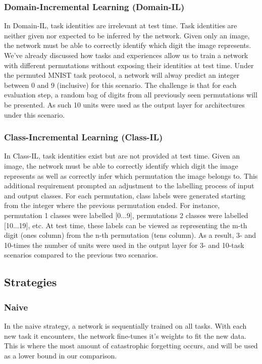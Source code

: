 \documentclass{article}
\begin{document}
\subsubsection{Domain-Incremental Learning (Domain-IL)}
In Domain-IL, task identities are irrelevant at test time. Task identities are neither given nor expected to be inferred by the network. Given only an image, the network must be able to correctly identify which digit the image represents. We’ve already discussed how tasks and experiences allow us to train a network with different permutations without exposing their identities at test time. Under the permuted MNIST task protocol, a network will alway predict an integer between 0 and 9 (inclusive) for this scenario. The challenge is that for each evaluation step, a random bag of digits from all previously seen permutations will be presented. As such 10 units were used as the output layer for architectures under this scenario.

\subsubsection{Class-Incremental Learning (Class-IL)}
In Class-IL, task identities exist but are not provided at test time. Given an image, the network must be able to correctly identify which digit the image represents as well as correctly infer which permutation the image belongs to. This additional requirement prompted an adjustment to the labelling process of input and output classes. For each permutation, class labels were generated starting from the integer where the previous permutation ended. For instance, permutation 1 classes were labelled [0...9], permutations 2 classes were labelled [10...19], etc. At test time, these labels can be viewed as representing the m-th digit (ones column) from the n-th permutation (tens column). As a result, 3- and 10-times the number of units were used in the output layer for 3- and 10-task scenarios compared to the previous two scenarios. 

\subsection{Strategies}

\subsubsection{Naive}
In the naive strategy, a network is sequentially trained on all tasks. With each new task it encounters, the network fine-tunes it’s weights to fit the new data. This is where the most amount of catastrophic forgetting occurs, and will be used as a lower bound in our comparison.
\end{document}
